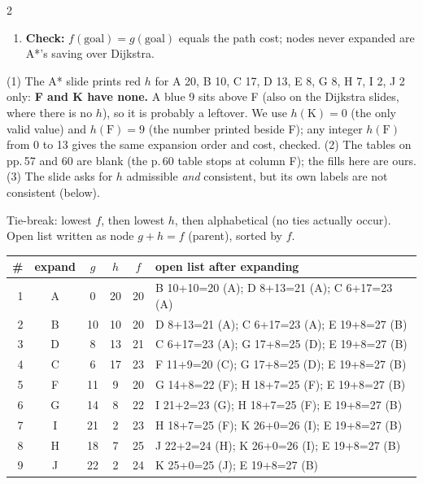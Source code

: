 \begin{multicols}{2}
\begin{recipe}[A* by hand]
\begin{enumerate}
\item \textbf{Check:} $f(\text{goal})=g(\text{goal})$ equals the path cost; nodes never expanded are A*'s saving over Dijkstra.
\end{enumerate}
\end{recipe}
\begin{slideerr}[pp.\,56--60]
(1) The A* slide prints red $h$ for A 20, B 10, C 17, D 13, E 8, G 8, H 7, I 2, J 2 only: \textbf{F and K have none.} A blue 9 sits above F (also on the Dijkstra slides, where there is no $h$), so it is probably a leftover. We use $h(\text{K})=0$ (the only valid value) and \textbf{$h(\text{F})=9$} (the number printed beside F); any integer $h(\text{F})$ from 0 to 13 gives the same expansion order and cost, checked. (2) The tables on pp.\,57 and 60 are blank (the p.\,60 table stops at column F); the fills here are ours. (3) The slide asks for $h$ admissible \emph{and} consistent, but its own labels are not consistent (below).
\end{slideerr}
\begin{worked}
Tie-break: lowest $f$, then lowest $h$, then alphabetical (no ties actually occur). Open list written as node $g{+}h{=}f$ (parent), sorted by $f$.\par\vspace{2pt}
\scriptsize\setlength{\tabcolsep}{2pt}
\begin{tabularx}{\linewidth}{@{}rcccc>{\raggedright\arraybackslash}X@{}}\toprule
\# & expand & $g$ & $h$ & $f$ & open list after expanding\\\midrule
1 & A & 0 & 20 & 20 & B 10+10=20 (A); D 8+13=21 (A); C 6+17=23 (A)\\
2 & B & 10 & 10 & 20 & D 8+13=21 (A); C 6+17=23 (A); E 19+8=27 (B)\\
3 & D & 8 & 13 & 21 & C 6+17=23 (A); G 17+8=25 (D); E 19+8=27 (B)\\
4 & C & 6 & 17 & 23 & F 11+9=20 (C); G 17+8=25 (D); E 19+8=27 (B)\\
5 & F & 11 & 9 & 20 & G 14+8=22 (F); H 18+7=25 (F); E 19+8=27 (B)\\
6 & G & 14 & 8 & 22 & I 21+2=23 (G); H 18+7=25 (F); E 19+8=27 (B)\\
7 & I & 21 & 2 & 23 & H 18+7=25 (F); K 26+0=26 (I); E 19+8=27 (B)\\
8 & H & 18 & 7 & 25 & J 22+2=24 (H); K 26+0=26 (I); E 19+8=27 (B)\\
9 & J & 22 & 2 & 24 & K 25+0=25 (J); E 19+8=27 (B)\\

\end{tabularx}
\end{worked}
\end{multicols}
